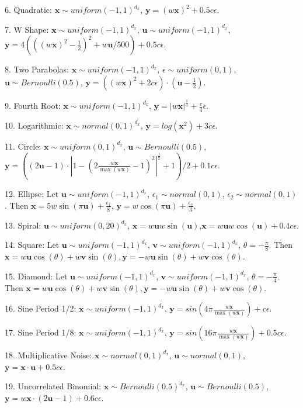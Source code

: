 \documentclass[11pt]{article}
\providecommand{\mb}[1]{\boldsymbol{#1}}
\begin{document}
6. Quadratic: $\mb{x} \sim uniform(-1,1)^{d_{x}}$, $\mb{y}=(w\mb{x})^2+0.5c\epsilon$.

7. W Shape: $\mb{x} \sim uniform(-1,1)^{d_{x}}$, $\mb{u} \sim uniform(-1,1)^{d_{x}}$, $\mb{y}=4( ( (w\mb{x})^2 - \frac{1}{2} )^2 + w\mb{u}/500 )+0.5c\epsilon$.

8. Two Parabolas: $\mb{x} \sim uniform(-1,1)^{d_{x}}$, $\epsilon \sim uniform(0,1)$, $\mb{u} \sim Bernoulli(0.5)$, $\mb{y}=( (w\mb{x})^2  + 2c\epsilon) \cdot (\mb{u}-\frac{1}{2})$.

9. Fourth Root: $\mb{x} \sim uniform(-1,1)^{d_{x}}$, $\mb{y}=|w\mb{x}|^\frac{1}{4}+\frac{c}{4}\epsilon$.

10. Logarithmic: $\mb{x} \sim normal(0, 1)^{d_{x}}$, $\mb{y}=log(\mb{x}^2)+3c\epsilon$.

11. Circle: $\mb{x} \sim uniform(0,1)^{d_{x}}$, $\mb{u} \sim Bernoulli(0.5)$, $\mb{y}=((2\mb{u}-1) \cdot |1-(2\frac{w\mb{x}}{\max(w\mb{x})}-1)^2|^{\frac{1}{2}}+1)/2+0.1c\epsilon$.

12. Ellipse: Let $\mb{u} \sim uniform(-1,1)^{d_{x}}$, $\epsilon_{1} \sim normal(0,1)$, $\epsilon_{2} \sim normal(0,1)$. Then $\mb{x}=5w\sin(\pi \mb{u})+\frac{\epsilon_{1}}{8}$, $\mb{y}=w\cos(\pi \mb{u})+\frac{\epsilon_{2}}{3}$. 

13. Spiral: $\mb{u} \sim uniform(0,20)^{d_{x}}$, $\mb{x}=w\mb{u}w\sin(\mb{u})$,$\mb{x}=w\mb{u}w\cos(\mb{u})+0.4c\epsilon$. 

14. Square: Let $\mb{u} \sim uniform(-1,1)^{d_{x}}$, $\mb{v} \sim uniform(-1,1)^{d_{x}}$, $\theta=-\frac{\pi}{8}$. Then $\mb{x}=w\mb{u} \cos(\theta) + w\mb{v} \sin(\theta), \mb{y}=-w\mb{u} \sin(\theta) + w\mb{v} \cos(\theta)$. 

15. Diamond: Let $\mb{u} \sim uniform(-1,1)^{d_{x}}$, $\mb{v} \sim uniform(-1,1)^{d_{x}}$, $\theta=-\frac{\pi}{4}$. Then $\mb{x}=w\mb{u} \cos(\theta) + w\mb{v} \sin(\theta), \mb{y}=-w\mb{u} \sin(\theta) + w\mb{v} \cos(\theta)$. 

16. Sine Period 1/2: $\mb{x} \sim uniform(-1,1)^{d_{x}}$, $\mb{y}=sin(4\pi \frac{w\mb{x}}{\max(w\mb{x})})+c\epsilon$.

17. Sine Period 1/8: $\mb{x} \sim uniform(-1,1)^{d_{x}}$, $\mb{y}=sin(16\pi \frac{w\mb{x}}{\max(w\mb{x})})+0.5c\epsilon$.    

18. Multiplicative Noise: $\mb{x} \sim normal(0, 1)^{d_{x}}$, $\mb{u} \sim normal(0, 1)$, $\mb{y}=\mb{x} \cdot \mb{u}+0.5c\epsilon$.

19. Uncorrelated Binomial: $\mb{x} \sim Bernoulli(0.5)^{d_{x}}$, $\mb{u} \sim Bernoulli(0.5)$, $\mb{y}=w\mb{x} \cdot (2\mb{u}-1)+0.6c\epsilon$.
\end{document}
